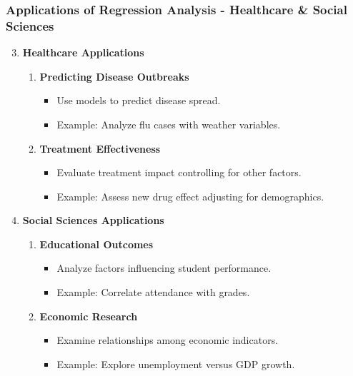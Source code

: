 \documentclass{beamer}
\begin{document}
\begin{frame}[fragile]
    \frametitle{Applications of Regression Analysis - Healthcare \& Social Sciences}
    \begin{enumerate}
        \setcounter{enumi}{2}
        \item \textbf{Healthcare Applications}
            \begin{enumerate}
                \item \textbf{Predicting Disease Outbreaks}
                    \begin{itemize}
                        \item Use models to predict disease spread.
                        \item Example: Analyze flu cases with weather variables.
                    \end{itemize}
                
                \item \textbf{Treatment Effectiveness}
                    \begin{itemize}
                        \item Evaluate treatment impact controlling for other factors.
                        \item Example: Assess new drug effect adjusting for demographics.
                    \end{itemize}
            \end{enumerate}

        \item \textbf{Social Sciences Applications}
            \begin{enumerate}
                \item \textbf{Educational Outcomes}
                    \begin{itemize}
                        \item Analyze factors influencing student performance.
                        \item Example: Correlate attendance with grades.
                    \end{itemize}
                
                \item \textbf{Economic Research}
                    \begin{itemize}
                        \item Examine relationships among economic indicators.
                        \item Example: Explore unemployment versus GDP growth.
                    \end{itemize}
            \end{enumerate}
    \end{enumerate}
\end{frame}
\end{document}
